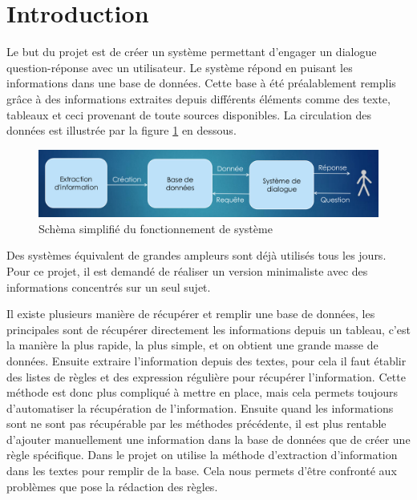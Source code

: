 \documentclass[11pt,a4paper]{article}
\begin{document}



\tableofcontents

\clearpage

\section{Introduction}

Le but du projet est de créer un système permettant d'engager un dialogue question-réponse avec un utilisateur. Le système répond en puisant les informations dans une base de données. Cette base à été préalablement remplis grâce à des informations extraites depuis différents éléments comme des texte, tableaux et ceci provenant de toute sources disponibles. 
La circulation des données est illustrée par la figure \ref{fig:schema} en dessous.

\begin{figure}[!htb]
	\includegraphics[width=\textwidth]{schemaSysteme.png}
	\caption{Schèma simplifié du fonctionnement de système}
	\label{fig:schema}
\end{figure}

Des systèmes équivalent de grandes ampleurs sont déjà utilisés tous les jours. Pour ce projet, il est demandé de réaliser un version minimaliste avec des informations concentrés sur un seul sujet.

Il existe plusieurs manière de récupérer et remplir une base de données, les principales sont de récupérer directement les informations depuis un tableau, c'est la manière la plus rapide, la plus simple, et on obtient une grande masse de données. Ensuite extraire l'information depuis des textes, pour cela il faut établir des listes de règles et des expression régulière pour récupérer l'information. Cette méthode est donc plus compliqué à mettre en place, mais cela permets toujours d'automatiser la récupération de l'information. Ensuite quand les informations sont ne sont pas récupérable par les méthodes précédente, il est plus rentable d'ajouter manuellement une information dans la base de données que de créer une règle spécifique.
Dans le projet on utilise la méthode d'extraction d'information dans les textes pour remplir de la base. Cela nous permets d'être confronté aux problèmes que pose la rédaction des règles.
\end{document}
